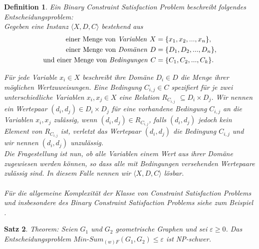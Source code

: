 \documentclass[a4paper, 12pt, twoside]{article}
\theoremstyle{Format1} %
\newtheorem{Def}{Definition}[section]       %
\newtheorem{Satz}[Def]{Satz}                %
\begin{document}
\begin{Def}
	Ein \textit{Binary Constraint Satisfaction Problem} beschreibt folgendes Entscheidungsproblem:
	\\
	Gegeben eine Instanz $\langle X,D,C \rangle$ bestehend aus
	\begin{align*}
		\text{einer Menge von \textit{Variablen }}X &= \{x_1, x_2, ..., x_n\},\\
		\text{einer Menge von \textit{Domänen }}D &= \{D_1, D_2, ..., D_n\},\\
		\text{und einer Menge von \textit{Bedingungen }}C &= \{C_1, C_2, ..., C_k\}.
	\end{align*}

	Für jede Variable $ x_i \in X$ beschreibt ihre Domäne $ D_i \in D$ die Menge ihrer möglichen Wertzuweisungen.
	Eine Bedingung $C_{i,j} \in C$ spezifiert für je zwei unterschiedliche Variablen $x_i, x_j \in X$ eine Relation $R_{C_{i,j}}$ $\subseteq D_i \times D_j$.
	Wir nennen ein Wertepaar $(d_i, d_j) \in D_i \times D_j$ für eine vorhandene Bedingung $C_{i,j}$ an die Variablen $x_i,x_j$ \textit{zulässig}, wenn $(d_i,d_j) \in R_{C_{i,j}}$,
	falls $(d_i,d_j)$ jedoch kein Element von $R_{C_{i,j}}$ ist, \textit{verletzt} das Wertepaar $(d_i, d_j)$ die Bedingung $C_{i,j}$
	und wir nennen $(d_i,d_j)$ \textit{unzulässig}.
	\\
	Die Fragestellung ist nun, ob alle Variablen einem Wert aus ihrer Domäne zugewiesen werden können, so dass alle mit Bedingungen versehenden Wertepaare zulässig sind.
	In diesem Falle nennen wir $\langle X,D,C \rangle$ \textit{lösbar}.
	\\
	\\
	Für die allgemeine Komplexität der Klasse von \textit{Constraint Satisfaction Problems} und insbesondere des
	\textit{Binary Constraint Satisfaction Problems} siehe zum Beispiel \cite{Karp}.
\end{Def}

\begin{Satz} \label{Satz NP-Schwerheit}
	Theorem: Seien $G_1$ und $G_2$ geometrische Graphen und sei $\varepsilon \geq 0$.
	Das Entscheidungsproblem $\textit{Min-Sum}_{(w)F}(G_1, G_2) \leq  \varepsilon $ ist NP-schwer.
\end{Satz}
\end{document}
